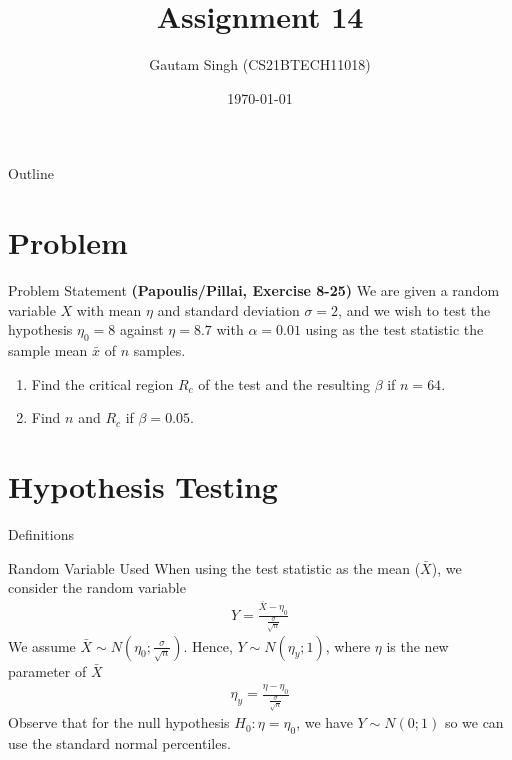 \documentclass{beamer}
\title{Assignment 14}
\author{Gautam Singh (CS21BTECH11018)}
\date{\today}
\begin{document}
\begin{frame}
    \titlepage 
\end{frame}

\begin{frame}{Outline}
    \tableofcontents
\end{frame}

\section{Problem}
\begin{frame}{Problem Statement}
	\textbf{(Papoulis/Pillai, Exercise 8-25)} We are given a random variable $X$ with mean $\eta$ and standard deviation $\sigma = 2$, and we wish to test the hypothesis $\eta_0 = 8$ against $\eta = 8.7$ with $\alpha = 0.01$ using as the test statistic the sample mean $\bar{x}$ of $n$ samples.
	\begin{enumerate}
		\item Find the critical region $R_c$ of the test and the resulting $\beta$ if $n = 64$. 
		\item Find $n$ and $R_c$ if $\beta = 0.05$.
	\end{enumerate}
\end{frame}

\section{Hypothesis Testing}
\begin{frame}{Definitions}
	\begin{alertblock}{Random Variable Used}
		When using the test statistic as the mean ($\bar{X}$), we consider the random variable
		\begin{align}
			Y = \frac{\bar{X} - \eta_0}{\frac{\sigma}{\sqrt{n}}}
			\label{eq:Q}
		\end{align}
		We assume $\bar{X} \sim N(\eta_0 ; \frac{\sigma}{\sqrt{n}})$. Hence, $Y \sim N(\eta_y ; 1)$, where $\eta$ is the new parameter of $\bar{X}$
		\begin{align}
			\eta_y = \frac{\eta - \eta_0}{\frac{\sigma}{\sqrt{n}}}
			\label{eq:eta-q}
		\end{align}
		Observe that for the null hypothesis $H_0: \eta = \eta_0$, we have $Y \sim N(0; 1)$ so we can use the standard normal percentiles.
	\end{alertblock}
\end{frame}
\end{document}
